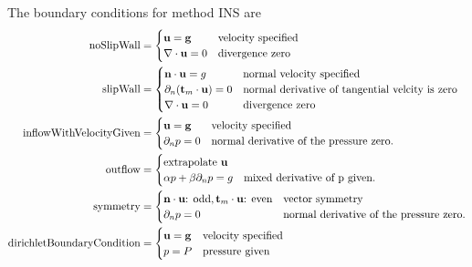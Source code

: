 \documentclass[10pt]{article}
\begin{document}
The boundary conditions for method INS are
\begin{align*}
  \text{noSlipWall} &= \begin{cases}
                           \mathbf{ u} = \mathbf{ g} & \text{velocity specified} \\
                           \nabla\cdot\mathbf{ u}=0 & \text{divergence zero} 
                       \end{cases}  \\
  \text{slipWall}   &=
     \begin{cases}
       \mathbf{ n}\cdot\mathbf{ u} = g & \text{normal velocity specified} \\
       \partial_n(\mathbf{ t}_m\cdot\mathbf{ u}) =0 & \text{normal derivative of tangential velcity is zero} \\
     \nabla\cdot\mathbf{ u}=0 & \text{divergence zero} 
     \end{cases}  \\
  \text{inflowWithVelocityGiven} &= \begin{cases}
                           \mathbf{ u} = \mathbf{ g} & \text{velocity specified} \\
                           \partial_n p =0 & \text{normal derivative of the pressure zero.}
                       \end{cases}  \\
  \text{outflow} &= \begin{cases}
                        \text{extrapolate~} \mathbf{ u} & \text{} \\
                        \alpha p + \beta \partial_n p = g & \text{mixed derivative of p given.}
                       \end{cases} \\
  \text{symmetry} &= \begin{cases}
                           \mathbf{ n}\cdot\mathbf{ u} \text{: odd}, \mathbf{ t}_m\cdot\mathbf{ u} \text{: even}  & \text{vector symmetry} \\
                           \partial_n p =0 & \text{normal derivative of the pressure zero.}
                       \end{cases}  \\
  \text{dirichletBoundaryCondition} &= \begin{cases}
                           \mathbf{ u} = \mathbf{ g} & \text{velocity specified} \\
                           p = P     & \text{pressure given} 
                       \end{cases}  
\end{align*}
\end{document}
